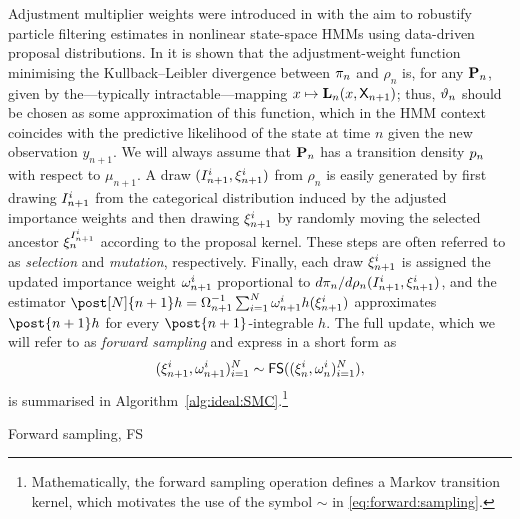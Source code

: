 Adjustment multiplier weights were introduced in \cite{pitt:shephard:1999} with the aim to robustify particle filtering estimates in nonlinear state-space HMMs using data-driven proposal distributions. In \cite{cornebise:moulines:olsson:2008} it is shown that the adjustment-weight function minimising the Kullback--Leibler divergence between $\pi_n$ and $\rho_n$ is, for any $\mathbf{P}_{n}$, given by the---typically intractable---mapping $x \mapsto \mathbf{L}_{n}(x, \mathsf{X}_{n + 1})$; thus, $\vartheta_{n}$ should be chosen as some approximation of this function, which in the HMM context coincides with the predictive likelihood of the state at time $n$ given the new observation $y_{n + 1}$. We will always assume that $\mathbf{P}_{n}$ has a transition density $p_{n}$ with respect to $\mu_{n + 1}$. A draw $(I_{n + 1}^{i}, \xi_{n + 1}^{i})$ from $\rho_n$ is easily generated by first drawing $I_{n + 1}^{i}$ from the categorical distribution induced by the adjusted importance weights and then drawing $\xi_{n + 1}^{i}$ by randomly moving the selected ancestor $\xi_{n}^{{I_{n + 1}^{i}}}$ according to the proposal kernel. These steps are often referred to as \emph{selection} and \emph{mutation}, respectively. Finally, each draw $\xi_{n + 1}^{i}$ is assigned the updated importance weight $\omega_{n + 1}^{i}$ proportional to $d \pi_n / d \rho_n (I_{n + 1}^{i}, \xi_{n + 1}^{i})$, and the estimator $\post[\N]{n + 1} h = \sumwght{n + 1}^{-1} \sum_{i = 1}^\N \ewght{n + 1}{i} h(\epart{n + 1}{i})$ approximates $\post{n + 1} h$ for every $\post{n + 1}$-integrable $h$. The full update, which we will refer to as \emph{forward sampling} and express in a short form as
\begin{equation} \label{eq:forward:sampling}
    (\epart{n + 1}{i}, \ewght{n + 1}{i})_{i = 1}^\N \sim \mathsf{FS}((\epart{n}{i}, \ewght{n}{i})_{i = 1}^\N),   
\end{equation}
is summarised in Algorithm~\ref{alg:ideal:SMC}.\footnote{Mathematically, the forward sampling operation defines a Markov transition kernel, which motivates the use of the symbol $\sim$ in \eqref{eq:forward:sampling}.} 

\begin{algorithm}[h] 
\caption{Forward sampling, \textsf{FS}} \label{alg:ideal:SMC}
\end{algorithm}

